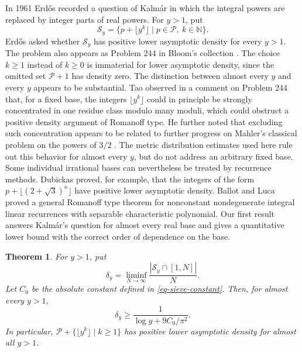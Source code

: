 \documentclass[11pt,reqno]{amsart}
\numberwithin{equation}{section}
\newtheorem{theorem}{Theorem}[section]
\begin{document}
    In 1961 Erd\H{o}s \cite[p. 230, Problem (14)]{Erdos1961} recorded a question of Kalm\'ar in which the integral powers are replaced by integer parts of real powers. For $y>1$, put
    $$
    \mathcal{S}_y=\{p+\lfloor y^k\rfloor\mid p\in\mathcal{P},\ k\in\mathbb{N}\}.
    $$
    Erd\H{o}s asked whether $\mathcal{S}_y$ has positive lower asymptotic density for every $y>1$. The problem also appears as Problem 244 in Bloom's collection \cite{Bloom244}. The choice $k\ge1$ instead of $k\ge0$ is immaterial for lower asymptotic density, since the omitted set $\mathcal{P}+1$ has density zero. The distinction between almost every $y$ and every $y$ appears to be substantial. Tao observed in a comment on Problem 244 \cite{Tao244} that, for a fixed base, the integers $\lfloor y^k\rfloor$ could in principle be strongly concentrated in one residue class modulo many moduli, which could obstruct a positive density argument of Romanoff type. He further noted that excluding such concentration appears to be related to further progress on Mahler's classical problem on the powers of $3/2$ \cite{Mahler}. The metric distribution estimates used here rule out this behavior for almost every $y$, but do not address an arbitrary fixed base. Some individual irrational bases can nevertheless be treated by recurrence methods. Dubickas \cite{Dubickas} proved, for example, that the integers of the form $p+\lfloor(2+\sqrt3)^n\rfloor$ have positive lower asymptotic density. Ballot and Luca \cite[Theorem~1]{BallotLuca} proved a general Romanoff type theorem for nonconstant nondegenerate integral linear recurrences with separable characteristic polynomial. Our first result answers Kalm\'ar's question for almost every real base and gives a quantitative lower bound with the correct order of dependence on the base.

    \begin{theorem}\label{thm-romanoff}
        For $y>1$, put
        $$
        \delta_y=\liminf_{N\to\infty}\frac{\left|\mathcal{S}_y\cap[1,N]\right|}{N}.
        $$
        Let $C_0$ be the absolute constant defined in \eqref{eq-sieve-constant}. Then, for almost every $y>1$,
        \begin{equation}\label{eq-explicit-density-bound}
            \delta_y\ge \frac{1}{\log y+9C_0/\pi^2}.
        \end{equation}
        In particular, $\mathcal{P}+\{\lfloor y^k\rfloor\mid k\ge1\}$ has positive lower asymptotic density for almost all $y>1$.
    \end{theorem}
\end{document}

